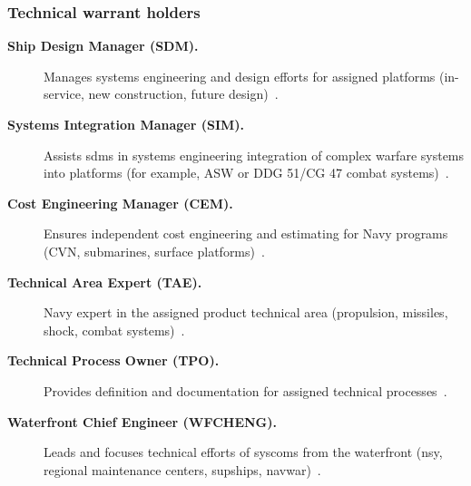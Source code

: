 \documentclass[../main.tex]{subfiles}
\begin{document}
\subsubsection{Technical warrant holders}\label{sec:twhs}
\begin{description}
  \item[\textbf{Ship Design Manager (SDM).}] Manages systems engineering and design efforts for assigned platforms (in-service, new construction, future design)~\autocite{edo-2-1-5-technical-authority-2025}.
  \item[\textbf{Systems Integration Manager (SIM).}] Assists \acp{sdm} in systems engineering integration of complex warfare systems into platforms (for example, ASW or DDG 51/CG 47 combat systems)~\autocite{edo-2-1-5-technical-authority-2025}.
  \item[\textbf{Cost Engineering Manager (CEM).}] Ensures independent cost engineering and estimating for Navy programs (CVN, submarines, surface platforms)~\autocite{edo-2-1-5-technical-authority-2025}.
  \item[\textbf{Technical Area Expert (TAE).}] Navy expert in the assigned product technical area (propulsion, missiles, shock, combat systems)~\autocite{edo-2-1-5-technical-authority-2025}.
  \item[\textbf{Technical Process Owner (TPO).}] Provides definition and documentation for assigned technical processes~\autocite{edo-2-1-5-technical-authority-2025}.
  \item[\textbf{Waterfront Chief Engineer (WFCHENG).}] Leads and focuses technical efforts of \acp{syscom} from the waterfront (\ac{nsy}, regional maintenance centers, \acp{supship}, \ac{navwar})~\autocite{edo-2-1-5-technical-authority-2025}.
\end{description}
\end{document}
